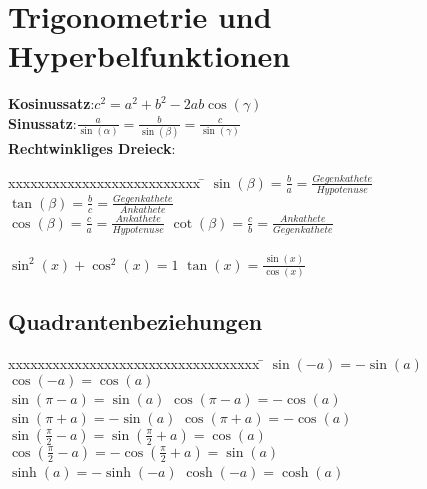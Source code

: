 \section{Trigonometrie und Hyperbelfunktionen}
	\begin{minipage}[t]{0.55\textwidth}
		\textbf{Kosinussatz}:\quad $c^{2}=a^{2}+b^{2}-2ab\cos(\gamma)$\\
		\textbf{Sinussatz}:\qquad $\frac{a}{\sin(\alpha)}=\frac{b}{\sin(\beta)}=\frac{c}{\sin(\gamma)}$\\[8pt]
		\textbf{Rechtwinkliges Dreieck}:
		\begin{tabbing}
			xxxxxxxxxxxxxxxxxxxxxxxxxx \= \kill
			$\sin(\beta)=\frac{b}{a}=\frac{Gegenkathete}{Hypotenuse}$\> $\tan(\beta)=\frac{b}{c}=\frac{Gegenkathete}{Ankathete}$\\
			$\cos(\beta)=\frac{c}{a}=\frac{Ankathete}{Hypotenuse}$\>
			$\cot(\beta)=\frac{c}{b}=\frac{Ankathete}{Gegenkathete}$\\
			\\
			$\sin^{2}(x)+\cos^{2}(x)=1$ \> $\tan(x)=\frac{\sin(x)}{\cos(x)}$
		\end{tabbing}
	\end{minipage}
%
	\begin{minipage}[t]{0.45\textwidth}
		\begin{flushright}
			\strut\vspace*{-\baselineskip}\newline
			
		\end{flushright}
	\end{minipage}
%
\subsection{Quadrantenbeziehungen}
\begin{tabbing}
	xxxxxxxxxxxxxxxxxxxxxxxxxxxxxxxxxx \= \kill
	$\sin(-a)=-\sin(a)$ \> $\cos(-a)=\cos(a)$\\
	$\sin(\pi - a)=\sin(a)$ \> $\cos(\pi - a)=-\cos(a)$\\
	$\sin(\pi + a)=-\sin(a)$ \> $\cos(\pi +a)=-\cos(a)$\\
	$\sin\left(\frac{\pi}{2}-a \right)=\sin\left(\frac{\pi}{2}+a \right)=\cos(a)$ \>
	$\cos\left(\frac{\pi}{2}-a \right)=-\cos\left(\frac{\pi}{2}+a \right)=\sin(a)$\\
	$\sinh(a)=-\sinh(-a)$ \> $\cosh(-a)=\cosh(a)$
\end{tabbing}

